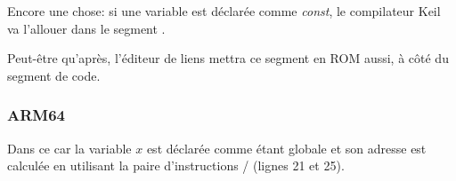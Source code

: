Encore une chose: si une variable est déclarée comme \emph{const}, le compilateur
Keil va l'allouer dans le segment .

Peut-être qu'après, l'éditeur de liens mettra ce segment en ROM aussi, à côté du segment de code.

\subsubsection{ARM64}




Dans ce car la variable $x$ est déclarée comme étant globale et son adresse est
calculée en utilisant la paire d'instructions / (lignes 21 et 25).

